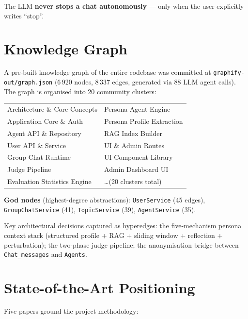 \documentclass[12pt,a4paper]{article}
\begin{document}
The LLM \textbf{never stops a chat autonomously} --- only when the user explicitly writes ``stop''.

\section{Knowledge Graph}

A pre-built knowledge graph of the entire codebase was committed at
\texttt{graphify-out/graph.json} (6\,920 nodes, 8\,337 edges, generated via 88 LLM agent
calls). The graph is organised into 20 community clusters:

\begin{tabular}{@{}ll@{}}
  Architecture \& Core Concepts & Persona Agent Engine \\
  Application Core \& Auth      & Persona Profile Extraction \\
  Agent API \& Repository       & RAG Index Builder \\
  User API \& Service           & UI \& Admin Routes \\
  Group Chat Runtime            & UI Component Library \\
  Judge Pipeline                & Admin Dashboard UI \\
  Evaluation Statistics Engine  & \ldots (20 clusters total) \\
\end{tabular}

\textbf{God nodes} (highest-degree abstractions): \texttt{UserService} (45 edges),
\texttt{GroupChatService} (41), \texttt{TopicService} (39), \texttt{AgentService} (35).

Key architectural decisions captured as hyperedges: the five-mechanism persona context stack
(structured profile + RAG + sliding window + reflection + perturbation); the two-phase judge
pipeline; the anonymisation bridge between \texttt{Chat\_messages} and \texttt{Agents}.

\section{State-of-the-Art Positioning}

Five papers ground the project methodology:
\end{document}
